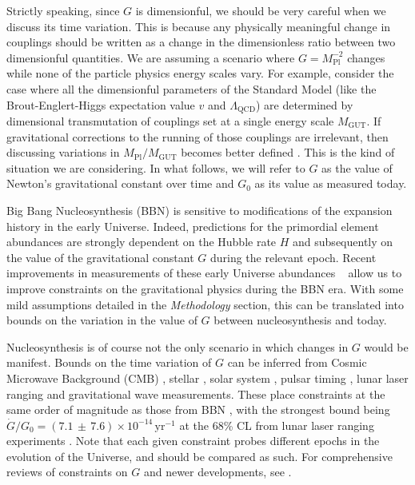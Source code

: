 \documentclass[notitlepage,twocolumn,letterpaper,natbib,aps,prl,amsmath,amsfonts,nofootinbib,preprintnumbers,superscriptaddress,secnumarabic,groupedaddress]{revtex4-1}
\begin{document}
Strictly speaking, since $G$ is dimensionful, we should be very careful when we discuss its time variation. This is because any physically meaningful change in couplings should be written as a change in the dimensionless ratio between two dimensionful quantities.  We are assuming a scenario where $G=M_{\mathrm{Pl}}^{-2}$ changes while none of the particle physics energy scales vary.  For example, consider the case where all the dimensionful parameters of the Standard Model (like the Brout-Englert-Higgs expectation value $v$ and $\Lambda_\mathrm{QCD}$) are determined by dimensional transmutation of couplings set at a single energy scale $M_\mathrm{GUT}$. If gravitational corrections to the running of those couplings are irrelevant, then discussing variations in $M_\mathrm{Pl}/M_\mathrm{GUT}$ becomes better defined \cite{Duff:2014mva}.  This is the kind of situation we are considering.  In what follows, we will refer to $G$ as the value of Newton's gravitational constant over time and $G_0$ as its value as measured today.


Big Bang Nucleosynthesis (BBN) is sensitive to modifications of the expansion history in the early Universe. Indeed, predictions for the primordial element abundances are strongly dependent on the Hubble rate $H$ and subsequently on the value of the gravitational constant $G$ during the relevant epoch. Recent improvements in measurements of these early Universe abundances ~\cite{2017RMxAC..49..181P,Aver:2015iza,Izotov:2014fga, Cooke:2016rky,Balashev:2015hoe,2018MNRAS.477.5536Z,Riemer-Sorensen:2017pey} allow us to improve constraints on the gravitational physics during the BBN era. With some mild assumptions detailed in the \emph{Methodology} section, this can be translated into bounds on the variation in the value of $G$ between nucleosynthesis and today.

Nucleosynthesis is of course not the only scenario in which changes in $G$ would be manifest. Bounds on the time variation of $G$ can be inferred from Cosmic Microwave Background (CMB) \cite{Bai:2015vca, Ooba:2017gyn}, stellar \cite{GarciaBerro:2011wc, Mould:2014iga, Bellinger:2019lnl}, solar system \cite{Chandler:1993, Pitjeva:2013chs, Fienga:2014bvy}, pulsar timing \cite{Kaspi:1994hp, Zhu:2018etc}, lunar laser ranging \cite{Williams:2004qba, Hofmann:2018myc} and gravitational wave \cite{Yunes:2009bv, Zhao:2018gwk} measurements. These place constraints at the same order of magnitude as those from BBN \cite{Campbell:1994bf,Dent:2001ga,Copi:2003xd, Clifton:2005xr}, with the strongest bound being $\dot{G}/G_0 = (7.1 \, \pm \, 7.6) \times 10^{-14} \, \mathrm{yr}^{-1}$ at the 68\% CL from lunar laser ranging experiments \cite{Hofmann:2018myc}. Note that each given constraint probes different epochs in the evolution of the Universe, and should be compared as such. For comprehensive reviews of constraints on $G$ and newer developments, see \cite{Uzan:2002vq, Uzan:2010pm, Martins:2017yxk}.
\end{document}
